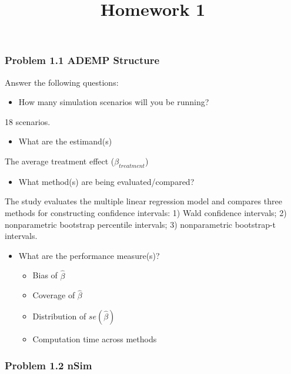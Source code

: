 \documentclass[
]{article}
\title{Homework 1}
\author{}
\date{\vspace{-2.5em}}
\providecommand{\tightlist}{%
  \setlength{\itemsep}{0pt}\setlength{\parskip}{0pt}}
\begin{document}
\maketitle

\subsubsection{Problem 1.1 ADEMP
Structure}\label{problem-1.1-ademp-structure}

Answer the following questions:

\begin{itemize}
\tightlist
\item
  How many simulation scenarios will you be running?
\end{itemize}

18 scenarios.

\begin{itemize}
\tightlist
\item
  What are the estimand(s)
\end{itemize}

The average treatment effect (\(\beta_{treatment}\))

\begin{itemize}
\tightlist
\item
  What method(s) are being evaluated/compared?
\end{itemize}

The study evaluates the multiple linear regression model and compares
three methods for constructing confidence intervals: 1) Wald confidence
intervals; 2) nonparametric bootstrap percentile intervals; 3)
nonparametric bootstrap-t intervals.

\begin{itemize}
\tightlist
\item
  What are the performance measure(s)?

  \begin{itemize}
  \tightlist
  \item
    Bias of \(\hat{\beta}\)
  \item
    Coverage of \(\hat{\beta}\)
  \item
    Distribution of \(se(\hat{\beta})\)
  \item
    Computation time across methods
  \end{itemize}
\end{itemize}

\subsubsection{Problem 1.2 nSim}\label{problem-1.2-nsim}
\end{document}
